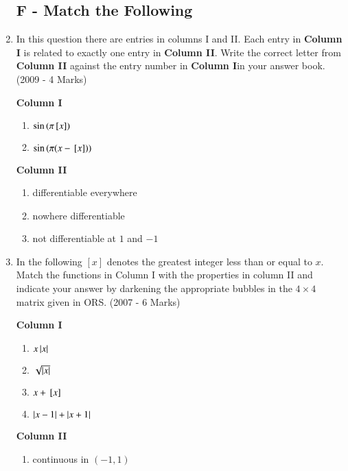 \documentclass[journal,12pt,twocolumn]{IEEEtran}
\theoremstyle{remark}
\begin{document}
\begin{enumerate}
\subsection*{F - Match the Following}
		 \item In this question there are entries in columns I and II. Each entry in \textbf{Column I} is related to exactly one entry in \textbf{Column II}. Write the correct letter from \textbf{Column II} against the entry number in \textbf{Column I}in your answer book.      \hfill(2009 - 4 Marks)
			\begin{multicols}{2}
                 \textbf{Column I}
				\begin{enumerate}
					\item	$\sin{(\pi\ensuremath{{}\left[x\right]})}$
					\item $\sin{(\pi(x-\ensuremath{{}\left[x\right]}))}$
				\end{enumerate}
			\columnbreak
                 \textbf{Column II}
				\begin{enumerate}
					\item  differentiable everywhere 
						
					\item  nowhere differentiable

					\item  not differentiable at $1$ and $-1$ 
						
				\end{enumerate}
				\end{multicols}
			\item In the following $[x]$ denotes the greatest integer less than or equal to $ x$. Match the functions in Column I with the properties in column II and indicate your answer by darkening the appropriate bubbles in the $4\times4$ matrix given in ORS.
                  \hfill(2007 - 6 Marks)
			\begin{multicols}{2}
				\textbf{Column I}

				\begin{enumerate}
					\item  $x\left\vert x\right\vert$ 
					\item  $\sqrt{\left\vert x\right\vert}$ 
					\item $x+{}\left[x\right]$ 
					\item  $\left\vert x-1\right\vert+\left\vert x+1\right\vert$
				\end{enumerate}
			\columnbreak
				\textbf{Column II}
				\begin{enumerate}
					\item  continuous in $(-1,1)$


\end{enumerate}
\end{multicols}
\end{enumerate}
\end{document}
